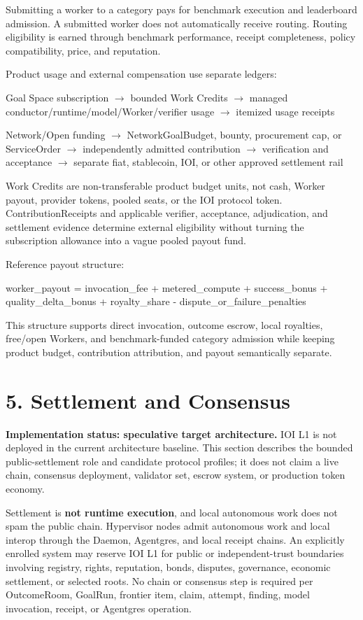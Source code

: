 \documentclass[
  11pt,
]{article}
\begin{document}
Submitting a worker to a category pays for benchmark execution and
leaderboard admission. A submitted worker does not automatically receive
routing. Routing eligibility is earned through benchmark performance,
receipt completeness, policy compatibility, price, and reputation.

Product usage and external compensation use separate ledgers:

Goal Space subscription $\rightarrow$ bounded Work Credits
$\rightarrow$ managed conductor/runtime/model/Worker/verifier usage
$\rightarrow$ itemized usage receipts

Network/Open funding $\rightarrow$ NetworkGoalBudget, bounty,
procurement cap, or ServiceOrder $\rightarrow$ independently admitted
contribution $\rightarrow$ verification and acceptance $\rightarrow$
separate fiat, stablecoin, IOI, or other approved settlement rail

Work Credits are non-transferable product budget units, not cash, Worker
payout, provider tokens, pooled seats, or the IOI protocol token.
ContributionReceipts and applicable verifier, acceptance, adjudication,
and settlement evidence determine external eligibility without turning
the subscription allowance into a vague pooled payout fund.

Reference payout structure:

worker\_payout = invocation\_fee + metered\_compute + success\_bonus +
quality\_delta\_bonus + royalty\_share - dispute\_or\_failure\_penalties

This structure supports direct invocation, outcome escrow, local
royalties, free/open Workers, and benchmark-funded category admission
while keeping product budget, contribution attribution, and payout
semantically separate.

\hypertarget{settlement-and-consensus}{%
\section{5. Settlement and Consensus}\label{settlement-and-consensus}}

\textbf{Implementation status: speculative target architecture.} IOI L1 is
not deployed in the current architecture baseline. This section describes
the bounded public-settlement role and candidate protocol profiles; it does
not claim a live chain, consensus deployment, validator set, escrow system,
or production token economy.

Settlement is \textbf{not runtime execution}, and local autonomous work
does not spam the public chain. Hypervisor nodes admit autonomous work and
local interop through the Daemon, Agentgres, and local receipt chains. An
explicitly enrolled system may reserve IOI L1 for public or independent-trust boundaries involving registry,
rights, reputation, bonds, disputes, governance, economic settlement, or
selected roots. No chain or consensus step is required per OutcomeRoom,
GoalRun, frontier item, claim, attempt, finding, model invocation, receipt,
or Agentgres operation.
\end{document}

